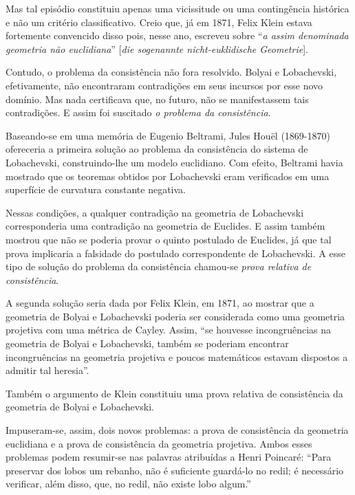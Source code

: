 \documentclass{hipatia}
\begin{document}
Mas tal episódio constituiu apenas uma vicissitude ou uma contingência histórica e não um critério classificativo. Creio que, já em 1871, Felix Klein estava fortemente convencido disso pois, nesse ano, escreveu sobre ``\emph{a assim denominada geometria não euclidiana}'' [\emph{die sogenannte nicht-euklidische Geometrie}].  \cite[p. 67]{bonola1906}\cite[p. 214]{yaglom}  

Contudo, o problema da consistência não fora resolvido. Bolyai e Lobachevski, efetivamente, não encontraram contradições em seus incursos por esse novo domínio. Mas nada certificava que, no futuro, não se manifestassem tais contradições. E assim foi suscitado \emph{o problema da consistência}.  \cite[p.  388]{kneale}  

Baseando-se em uma memória de Eugenio Beltrami, Jules Houël (1869-1870) ofereceria a primeira solução ao problema da consistência do sistema de Lobachevski, construindo-lhe um modelo euclidiano. Com efeito, Beltrami havia mostrado que os teoremas obtidos por Lobachevski eram verificados em uma superfície de curvatura constante negativa.  \cite[p. 320--321]{kagan1986}\cite[p. 32--33]{carmo1988}  

Nessas condições, a qualquer contradição na geometria de Lobachevski corresponderia uma contradição na geometria de Euclides. E assim também mostrou que não se poderia provar o quinto postulado de Euclides, já que tal prova implicaria a falsidade do postulado correspondente de Lobachevski. A esse tipo de solução do problema da consistência chamou-se \emph{prova relativa de consistência}.  \cite[p. 388]{kneale}\cite[p. 325]{fraenkel1963}

A segunda solução seria dada por Felix Klein, em 1871, ao  mostrar que a geometria de Bolyai e Lobachevski poderia ser considerada como uma geometria projetiva com uma métrica de Cayley. Assim, ``se houvesse incongruências na geometria de Bolyai e Lobachevski, também se poderiam encontrar incongruências na geometria projetiva e poucos matemáticos estavam dispostos a admitir tal heresia''. \cite[p. 178]{struik1987}  

Também o argumento de Klein constituiu uma prova relativa de consistência da geometria de Bolyai e Lobachevski.

Impuseram-se, assim, dois novos problemas: a prova de consistência da geometria euclidiana e a prova de consistência da geometria projetiva. Ambos esses problemas podem resumir-se nas palavras atribuídas a Henri Poincaré: ``Para preservar dos lobos um rebanho, não é suficiente guardá-lo no redil; é necessário verificar, além disso, que, no redil, não existe lobo algum.''  \cite[p. 59]{babini1974}
\end{document}
